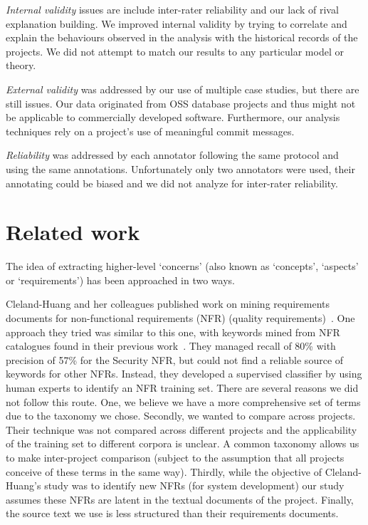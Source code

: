 \documentclass[]{sig-alternate}
\begin{document}
\emph{Internal validity} issues are include inter-rater reliability and our lack of rival explanation building. 
We improved internal validity by trying to correlate and explain the behaviours observed in the analysis with the historical records of the projects.
We did not attempt to match our results to any particular model or theory.

\emph{External validity} was addressed by our use of multiple case studies, but there are still issues. 
Our data originated from OSS database projects and thus might not be applicable to commercially developed software. 
Furthermore, our analysis techniques rely on a project's use of meaningful commit messages. 

\emph{Reliability} was addressed by each annotator following the same protocol and using the same annotations. 
Unfortunately only two annotators were used, their annotating could be biased and we did not analyze for inter-rater reliability.


\section{Related work}
\label{sec:related}
The idea of extracting higher-level `concerns' (also known as `concepts', `aspects' or `requirements') has been approached in two ways. 

Cleland-Huang and her colleagues published work on mining requirements documents for non-functional requirements (NFR) (quality requirements)~\cite{Cleland-Huang2006}. One approach they tried was similar to this one, with keywords mined from NFR catalogues found in their previous work~\cite{chung99}. They managed recall of 80\% with precision of 57\% for the Security NFR, but could not find a reliable source of keywords for other NFRs. Instead, they developed a supervised classifier by using human experts to identify an NFR training set. There are several reasons we did not follow this route. One, we believe we have a more comprehensive set of terms due to the taxonomy we chose. Secondly, we wanted to compare across projects. Their technique was not compared across different projects and the applicability of the training set to different corpora is unclear. A common taxonomy allows us to make inter-project comparison (subject to the assumption that all projects conceive of these terms in the same way). Thirdly, while the objective of Cleland-Huang's study was to identify new NFRs (for system development) our study assumes these NFRs are latent in the textual documents of the project. Finally, the source text we use is less structured than their requirements documents.
\end{document}
